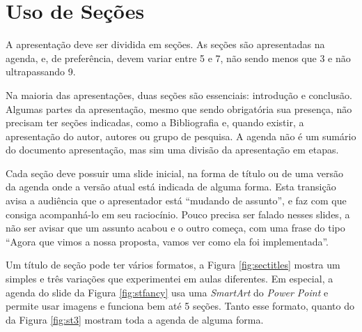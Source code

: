\section{Uso de Seções}

A apresentação deve ser dividida em seções. As seções são apresentadas na agenda, e, de preferência, devem variar entre 5 e 7, não sendo menos que 3 e não ultrapassando 9.

Na maioria das apresentações, duas seções são essenciais: introdução e conclusão. Algumas partes da apresentação, mesmo que sendo obrigatória sua presença, não precisam ter seções indicadas, como a Bibliografia e, quando existir, a apresentação do autor, autores ou grupo de pesquisa. A agenda não é um sumário do documento apresentação, mas sim uma divisão da apresentação em etapas.

Cada seção deve possuir uma slide inicial, na forma de título ou de uma versão da agenda onde a versão atual está indicada de alguma forma. Esta transição avisa a audiência que o apresentador está ``mudando de assunto'', e faz com que consiga acompanhá-lo em seu raciocínio. Pouco precisa ser falado nesses slides, a não ser avisar que um assunto acabou e o outro começa, com uma frase do tipo ``Agora que vimos a nossa proposta, vamos ver como ela foi implementada''.


 Um título de seção pode ter vários formatos, a Figura \ref{fig:sectitles} mostra um simples e três variações que experimentei em aulas diferentes. Em especial, a agenda do slide da Figura \ref{fig:stfancy} usa uma \textit{SmartArt} do \textit{Power Point} e permite usar imagens e funciona bem até 5 seções. Tanto esse formato, quanto do da Figura \ref{fig:st3} mostram toda a agenda de alguma forma.

